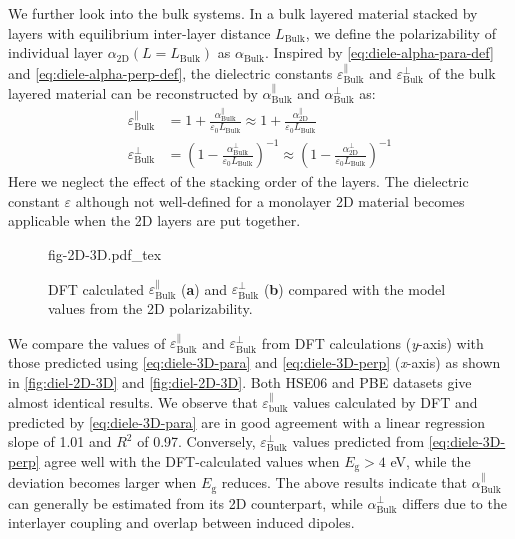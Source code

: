 We further look into the bulk systems. In a bulk layered material stacked by layers with equilibrium
inter-layer distance $L_{\mathrm{Bulk}}$, we define the polarizability
of individual layer $\alpha_{\mathrm{2D}}(L=L_{\mathrm{Bulk}})$ as
$\alpha_{\mathrm{Bulk}}$. Inspired by \autoref{eq:diele-alpha-para-def} and
\autoref{eq:diele-alpha-perp-def}, the dielectric constants
$\varepsilon^{\parallel}_{\mathrm{Bulk}}$ and
$\varepsilon^{\perp}_{\mathrm{Bulk}}$ of the bulk layered material can
be reconstructed by $\alpha_{\mathrm{Bulk}}^{\parallel}$ and
$\alpha_{\mathrm{Bulk}}^{\perp}$ as:
%
%
\begin{subequations}
\begin{align}
  \label{eq:diele-3D-para}
  \varepsilon^{\parallel}_{\mathrm{Bulk}}
  &= 1 + \frac{\alpha_{\mathrm{Bulk}}^{\parallel}}{\varepsilon_{0} L_{\mathrm{Bulk}}}
  \approx 1 + \frac{\alpha_{\mathrm{2D}}^{\parallel}}{\varepsilon_{0} L_{\mathrm{Bulk}}} \\
  \label{eq:diele-3D-perp}
  \varepsilon^{\perp}_{\mathrm{Bulk}}
  &= \left(1 - \frac{\alpha_{\mathrm{Bulk}}^{\perp}}{\varepsilon_{0} L_{\mathrm{Bulk}}}\right)^{-1}
  \approx \left(1 - \frac{\alpha_{\mathrm{2D}}^{\perp}}{\varepsilon_{0} L_{\mathrm{Bulk}}}\right)^{-1}
\end{align}
\end{subequations}
%
%
Here we neglect the effect of the stacking order of the layers.  The
dielectric constant $\varepsilon$ although not well-defined for a
monolayer 2D material becomes applicable when the 2D layers are put
together.
\begin{figure}[!htbp]
\centering
{fig-2D-3D.pdf_tex}
\caption{\label{fig:diel-2D-3D} %
  DFT calculated $\varepsilon_{\mathrm{Bulk}}^{\parallel}$
  (\textbf{a}) and $\varepsilon_{\mathrm{Bulk}}^{\perp}$ (\textbf{b})
  compared with the model values from the 2D polarizability.  }
\end{figure}
%
We compare the values of
$\varepsilon_{\mathrm{Bulk}}^{\parallel}$ and
$\varepsilon_{\mathrm{Bulk}}^{\perp}$ from DFT calculations (\textit{y}-axis)
with those predicted using \autoref{eq:diele-3D-para} and \autoref{eq:diele-3D-perp}
(\textit{x}-axis) as shown in \autoref{fig:diel-2D-3D} and \autoref{fig:diel-2D-3D}. 
Both HSE06 and PBE datasets give almost identical results.  
%
We observe that
$\varepsilon_{\mathrm{bulk}}^{\parallel}$ values calculated by DFT and
predicted by \autoref{eq:diele-3D-para} are in good agreement with a linear
regression slope of 1.01 and $R^2$ of 0.97. Conversely,
$\varepsilon_{\mathrm{Bulk}}^{\perp}$ values predicted from
 \autoref{eq:diele-3D-perp} agree well with the DFT-calculated values when
$E_{\mathrm{g}}>4$ eV, while the deviation becomes larger when
$E_{\mathrm{g}}$ reduces. The above results indicate that
$\alpha^{\parallel}_{\mathrm{Bulk}}$ can generally be estimated from
its 2D counterpart, while $\alpha^{\perp}_{\mathrm{Bulk}}$ differs due
to the interlayer coupling and overlap between induced
dipoles\autocite{Andersen_2015_dielec_vdWH,Laturia_2018_2D_eps}. 

